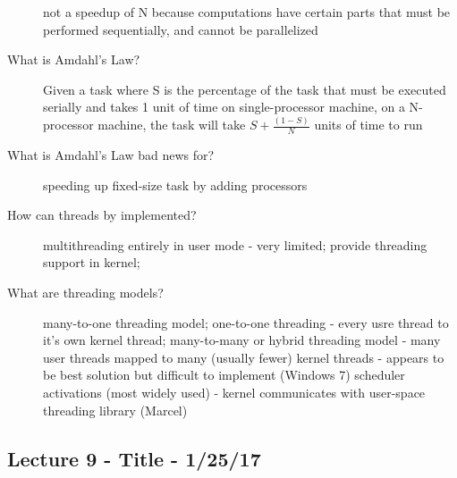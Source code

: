 \documentclass[10pt]{article}
\begin{document}
\begin{description}
  not a speedup of N because computations have certain parts that must be performed sequentially, and cannot be parallelized
\item[What is Amdahl's Law?]
  Given a task where S is the percentage of the task that must be executed serially and takes 1 unit of time on single-processor machine, on a N-processor machine, the task
  will take $S + \frac{(1 - S)}{N}$ units of time to run
\item[What is Amdahl's Law bad news for?]
  speeding up fixed-size task by adding processors
\item[How can threads by implemented?]
  multithreading entirely in user mode - very limited;
  provide threading support in kernel;
\item[What are threading models?]
  many-to-one threading model;
  one-to-one threading - every usre thread to it's own kernel thread;
  many-to-many or hybrid threading model - many user threads mapped to many (usually fewer) kernel threads - appears to be best solution but difficult to implement (Windows 7)
  scheduler activations (most widely used) - kernel communicates with user-space threading library (Marcel)
\end{description}

\begin{description}
\section{Lecture 9 - Title - 1/25/17}
\item[]
\end{description}
\end{document}
